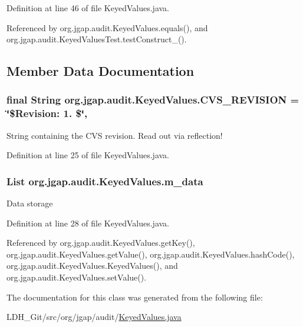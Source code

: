 Definition at line 46 of file Keyed\-Values.\-java.



Referenced by org.\-jgap.\-audit.\-Keyed\-Values.\-equals(), and org.\-jgap.\-audit.\-Keyed\-Values\-Test.\-test\-Construct\-\_().



\subsection{Member Data Documentation}
\hypertarget{classorg_1_1jgap_1_1audit_1_1_keyed_values_af8eb0df6d2c472f31997aec9b84a31dc}{
\subsubsection[{C\-V\-S\-\_\-\-R\-E\-V\-I\-S\-I\-O\-N}]{\setlength{\rightskip}{0pt plus 5cm}final String org.\-jgap.\-audit.\-Keyed\-Values.\-C\-V\-S\-\_\-\-R\-E\-V\-I\-S\-I\-O\-N = \char`\"{}\$Revision\-: 1. \$\char`\"{}\hspace{0.3cm}{\ttfamily [static]}, {\ttfamily [private]}}}\label{classorg_1_1jgap_1_1audit_1_1_keyed_values_af8eb0df6d2c472f31997aec9b84a31dc}
String containing the C\-V\-S revision. Read out via reflection! 

Definition at line 25 of file Keyed\-Values.\-java.

\hypertarget{classorg_1_1jgap_1_1audit_1_1_keyed_values_a85fd2e828068e5d1f52ede867fe76de7}{
\subsubsection[{m\-\_\-data}]{\setlength{\rightskip}{0pt plus 5cm}List org.\-jgap.\-audit.\-Keyed\-Values.\-m\-\_\-data\hspace{0.3cm}{\ttfamily [private]}}}\label{classorg_1_1jgap_1_1audit_1_1_keyed_values_a85fd2e828068e5d1f52ede867fe76de7}
Data storage 

Definition at line 28 of file Keyed\-Values.\-java.



Referenced by org.\-jgap.\-audit.\-Keyed\-Values.\-get\-Key(), org.\-jgap.\-audit.\-Keyed\-Values.\-get\-Value(), org.\-jgap.\-audit.\-Keyed\-Values.\-hash\-Code(), org.\-jgap.\-audit.\-Keyed\-Values.\-Keyed\-Values(), and org.\-jgap.\-audit.\-Keyed\-Values.\-set\-Value().



The documentation for this class was generated from the following file\-:\begin{DoxyCompactItemize}
\item 
L\-D\-H\-\_\-\-Git/src/org/jgap/audit/\hyperlink{_keyed_values_8java}{Keyed\-Values.\-java}\end{DoxyCompactItemize}
